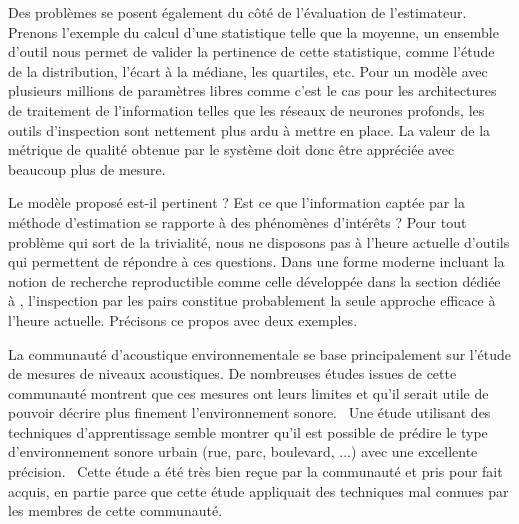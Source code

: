   Des problèmes se posent également du côté de l'évaluation de l'estimateur. Prenons l'exemple du calcul d'une statistique telle que la moyenne, un ensemble d'outil nous permet de valider la pertinence de cette statistique, comme l'étude de la distribution, l'écart à la médiane, les quartiles, etc. Pour un modèle avec plusieurs millions de paramètres libres comme c'est le cas pour les architectures de traitement de l'information telles que les réseaux de neurones profonds, les outils d'inspection sont nettement plus ardu à mettre en place. La valeur de la métrique de qualité obtenue par le système doit donc être appréciée avec beaucoup plus de mesure.

  Le modèle proposé est-il pertinent ? Est ce que l'information captée par la méthode d'estimation se rapporte à des phénomènes d'intérêts ? Pour tout problème qui sort de la trivialité, nous ne disposons pas à l'heure actuelle d'outils qui permettent de répondre à ces questions. Dans une forme moderne incluant la notion de recherche reproductible comme celle développée dans la section dédiée à , l'inspection par les pairs constitue probablement la seule approche efficace à l'heure actuelle. Précisons ce propos avec deux exemples.

  La communauté d'acoustique environnementale se base principalement sur l'étude de mesures de niveaux acoustiques. De nombreuses études issues de cette communauté montrent que ces mesures ont leurs limites et qu'il serait utile de pouvoir décrire plus finement l'environnement sonore.~\cite{lavandier2006contribution} Une étude utilisant des techniques d'apprentissage semble montrer qu'il est possible de prédire le type d'environnement sonore urbain (rue, parc, boulevard, ...) avec une excellente précision.~\cite{aucouturier2007bag} Cette étude a été très bien reçue par la communauté et pris pour fait acquis, en partie parce que cette étude appliquait des techniques mal connues par les membres de cette communauté.

